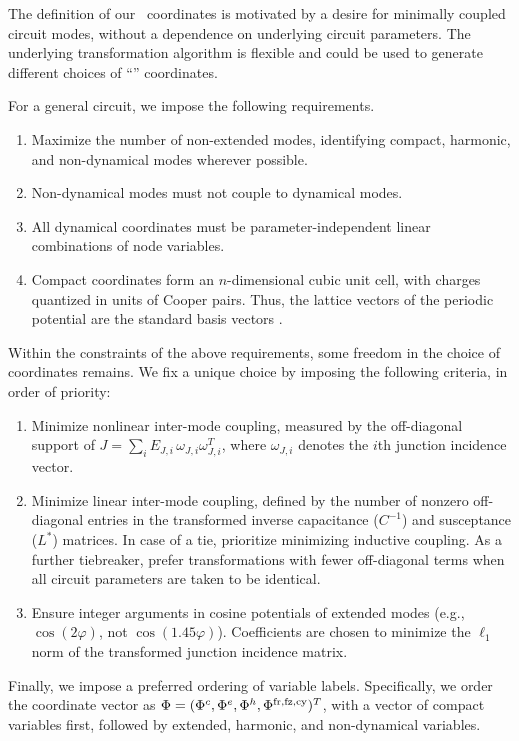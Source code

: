 The definition of our \canonical\ coordinates is motivated by a desire for minimally coupled circuit modes, without a dependence on underlying circuit parameters. The underlying transformation algorithm is flexible and could be used to generate different choices of ``\canonical'' coordinates.

For a general circuit, we impose the following requirements.
\begin{enumerate}
\item[(1)] Maximize the number of non-extended modes, identifying compact, harmonic, and non-dynamical modes wherever possible.
\item[(2)] Non-dynamical modes must not couple to dynamical modes.
\item[(3)] All dynamical coordinates must be parameter-independent linear combinations of node variables.
\item[(4)] Compact coordinates form an $n$-dimensional cubic unit cell, with charges quantized in units of Cooper pairs. Thus, the lattice vectors of the periodic potential are the standard basis vectors \cite{rajabzadehAnalysisArbitrarySuperconducting2023}.
\end{enumerate}
Within the constraints of the above requirements, some freedom in the choice of coordinates remains. We fix a unique choice by imposing the following criteria, in order of priority:

\begin{enumerate}
\item[(a)] Minimize nonlinear inter-mode coupling, measured by the off-diagonal support of 
$J = \sum_i E_{J,i}\,\omega_{J,i}\omega_{J,i}^T$, where $\omega_{J,i}$ denotes the $i$th junction incidence vector.
\item[(b)] Minimize linear inter-mode coupling, defined by the number of nonzero off-diagonal entries in the transformed inverse capacitance ($C^{-1}$) and susceptance ($L^*$) matrices. In case of a tie, prioritize minimizing inductive coupling. As a further tiebreaker, prefer transformations with fewer off-diagonal terms when all circuit parameters are taken to be identical.
\item[(c)] Ensure integer arguments in cosine potentials of extended modes (e.g., $\cos(2\varphi)$, not $\cos(1.45\varphi)$). Coefficients are chosen to minimize the $\ell_1$ norm of the transformed junction incidence matrix.
\end{enumerate}

Finally, we impose a preferred ordering of variable labels. Specifically, we order the coordinate vector as
$\Phi = (\Phi^{c}, \Phi^{e}, \Phi^{h}, \Phi^{\rm fr,fz,cy})^T$,
with a vector of compact variables first, followed by extended, harmonic, and non-dynamical variables.

